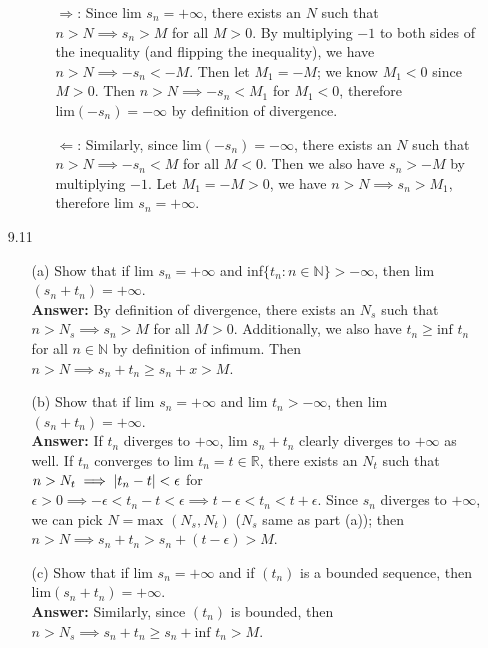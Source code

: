 \documentclass{article}
\begin{document}
\begin{itemize}
\begin{itemize}
                        \begin{itemize}
                              \item [$\Rightarrow$:] Since $\text{lim }s_n=+\infty$, there exists an $N$ such that $n>N\implies s_n>M$ for all $M>0$. By multiplying $-1$ to both sides of the inequality (and flipping the inequality), we have $n>N\implies -s_n<-M$. Then let $M_1=-M$; we know $M_1<0$ since $M>0$. Then $n>N\implies -s_n<M_1$ for $M_1<0$, therefore $\text{lim}(-s_n)=-\infty$ by definition of divergence.
                              \item [$\Leftarrow$:] Similarly, since $\text{lim}(-s_n)=-\infty$, there exists an $N$ such that $n>N\implies -s_n<M$ for all $M<0$. Then we also have $s_n>-M$ by multiplying $-1$. Let $M_1=-M>0$, we have $n>N\implies s_n>M_1$, therefore $\text{lim }s_n=+\infty$.
                        \end{itemize}
            \end{itemize}
      \item [9.11]
            \begin{itemize}
                  \item [(a)] Show that if $\text{lim }s_n=+\infty$ and inf$\{t_n:n\in\mathbb{N}\}>-\infty$, then lim$(s_n+t_n)=+\infty$.\\
                  \textbf{Answer: } By definition of divergence, there exists an $N_s$ such that $n>N_s\implies s_n>M$ for all $M>0$. Additionally, we also have $t_n\geq\text{inf }t_n$ for all $n\in\mathbb{N}$ by definition of infimum. Then $n>N\implies s_n+t_n\geq s_n+x>M$.
                  \item [(b)] Show that if $\text{lim }s_n=+\infty$ and $\text{lim }t_n>-\infty$, then lim$(s_n+t_n)=+\infty$.\\
                  \textbf{Answer: } If $t_n$ diverges to $+\infty$, $\text{lim }s_n+t_n$ clearly diverges to $+\infty$ as well. If $t_n$ converges to $\text{lim }t_n=t\in\mathbb{R}$, there exists an $N_t$ such that $n>N_t\implies\abs{t_n-t}<\epsilon$ for $\epsilon>0\implies -\epsilon<t_n-t<\epsilon\implies t-\epsilon<t_n<t+\epsilon$. Since $s_n$ diverges to $+\infty$, we can pick $N=\text{max }(N_s,N_t)$ ($N_s$ same as part (a)); then $n>N\implies s_n+t_n>s_n+(t-\epsilon)>M$.
                  \item [(c)] Show that if $\text{lim }s_n=+\infty$ and if $(t_n)$ is a bounded sequence, then lim$(s_n+t_n)=+\infty$.\\
                  \textbf{Answer: } Similarly, since $(t_n)$ is bounded, then $n>N_s\implies s_n+t_n\geq s_n+\text{inf }t_n>M$.

\end{itemize}
\end{itemize}
\end{document}
